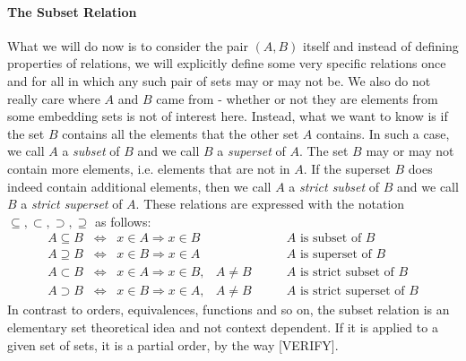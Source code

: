 \paragraph{The Subset Relation} 
What we will do now is to consider the pair $(A,B)$ itself and instead of defining properties of relations, we will explicitly define some very specific relations once and for all in which any such pair of sets may or may not be. We also do not really care where $A$ and $B$ came from - whether or not they are elements from some embedding sets is not of interest here. Instead, what we want to know is if the set $B$ contains all the elements that the other set $A$ contains. In such a case, we call $A$ a \emph{subset} of $B$ and we call $B$ a \emph{superset} of $A$. The set $B$ may or may not contain more elements, i.e. elements that are not in $A$. If the superset $B$ does indeed contain additional elements, then we call $A$ a \emph{strict subset} of $B$ and we call $B$ a \emph{strict superset} of $A$. These relations are expressed with the notation $\subseteq, \subset, \supset, \supseteq$ as follows:
\begin{eqnarray}
A \subseteq B \;\;  \Leftrightarrow \;\;   x \in A \Rightarrow x \in B&           \qquad & \text{$A$ is subset of $B$} \\
A \supseteq B \;\;  \Leftrightarrow \;\;   x \in B \Rightarrow x \in A&           \qquad & \text{$A$ is superset of $B$} \\
A \subset   B \;\;  \Leftrightarrow \;\;   x \in A \Rightarrow x \in B,& A \neq B \qquad & \text{$A$ is strict subset of $B$} \\
A \supset   B \;\;  \Leftrightarrow \;\;   x \in B \Rightarrow x \in A,& A \neq B \qquad & \text{$A$ is strict superset of $B$}
\end{eqnarray}
In contrast to orders, equivalences, functions and so on, the subset relation is an elementary set theoretical idea and not context dependent. If it is applied to a given set of sets, it is a partial order, by the way [VERIFY].

